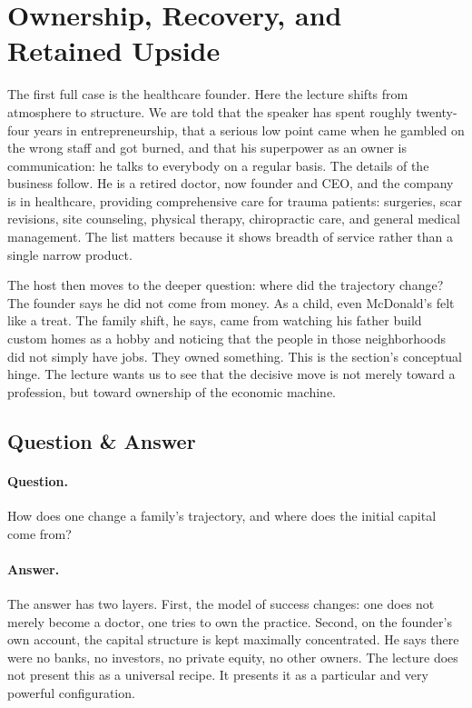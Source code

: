 \section{Ownership, Recovery, and Retained Upside}

The first full case is the healthcare founder. Here the lecture shifts from atmosphere to structure. We are told that the speaker has spent roughly twenty-four years in entrepreneurship, that a serious low point came when he gambled on the wrong staff and got burned, and that his superpower as an owner is communication: he talks to everybody on a regular basis. The details of the business follow. He is a retired doctor, now founder and CEO, and the company is in healthcare, providing comprehensive care for trauma patients: surgeries, scar revisions, site counseling, physical therapy, chiropractic care, and general medical management. The list matters because it shows breadth of service rather than a single narrow product.

The host then moves to the deeper question: where did the trajectory change? The founder says he did not come from money. As a child, even McDonald's felt like a treat. The family shift, he says, came from watching his father build custom homes as a hobby and noticing that the people in those neighborhoods did not simply have jobs. They owned something. This is the section's conceptual hinge. The lecture wants us to see that the decisive move is not merely toward a profession, but toward ownership of the economic machine.

\subsection{Question \& Answer}

\paragraph{Question.} How does one change a family's trajectory, and where does the initial capital come from?

\paragraph{Answer.} The answer has two layers. First, the model of success changes: one does not merely become a doctor, one tries to own the practice. Second, on the founder's own account, the capital structure is kept maximally concentrated. He says there were no banks, no investors, no private equity, no other owners. The lecture does not present this as a universal recipe. It presents it as a particular and very powerful configuration.

